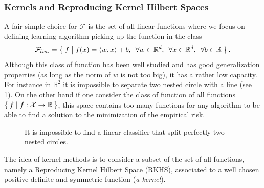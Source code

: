 \subsubsection{Kernels and Reproducing Kernel Hilbert Spaces}
A fair simple choice for $\mathcal{F}$ is the set of all linear functions where
we focus on defining learning algorithm picking up the  function in
the class
\begin{dmath*}
    \mathcal{F}_{lin.} = \Set{f | f(x) = \inner{w, x} + b, \enskip \forall w \in
    \mathbb{R}^d, \enskip \forall x \in \mathbb{R}^d, \enskip \forall b \in
    \mathbb{R}}.
\end{dmath*}
Although this class of function has been well studied and has good
generalization properties (as long as the norm of $w$ is not too big), it has a
rather low capacity.  For instance in $\mathbb{R}^2$ it is impossible to
separate two nested circle with a line (see \cref{fig:nested_circle}). On the
other hand if one consider the class of function of all functions $\Set{f |
f:\mathcal{X}\to\mathbb{R}}$, this space contains too many functions for any
algorithm to be able to find a solution to the minimization of the empirical
risk.
\begin{figure}
    \centering
    \caption[Separation of nested circles with linear classifier]{It is
    impossible to find a linear classifier that split perfectly two nested
    circles.}
    \label{fig:nested_circle}
\end{figure}
The idea of kernel methods \citep{KIMELDORF1971,Boser1992} is to consider a 
subset of the set of all functions, namely a Reproducing Kernel Hilbert Space (\acl{RKHS}), associated to a well chosen positive definite and symmetric function ({\it a kernel}).

